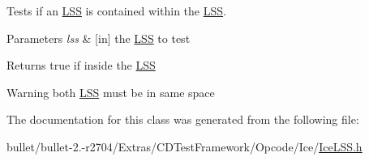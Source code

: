 Tests if an \hyperlink{class_l_s_s}{L\+S\+S} is contained within the \hyperlink{class_l_s_s}{L\+S\+S}. 
\begin{DoxyParams}{Parameters}
{\em lss} & \mbox{[}in\mbox{]} the \hyperlink{class_l_s_s}{L\+S\+S} to test \\
\hline
\end{DoxyParams}
\begin{DoxyReturn}{Returns}
true if inside the \hyperlink{class_l_s_s}{L\+S\+S} 
\end{DoxyReturn}
\begin{DoxyWarning}{Warning}
both \hyperlink{class_l_s_s}{L\+S\+S} must be in same space 
\end{DoxyWarning}


The documentation for this class was generated from the following file\+:\begin{DoxyCompactItemize}
\item 
bullet/bullet-\/2.-\/r2704/\+Extras/\+C\+D\+Test\+Framework/\+Opcode/\+Ice/\hyperlink{_ice_l_s_s_8h}{Ice\+L\+S\+S.\+h}\end{DoxyCompactItemize}
